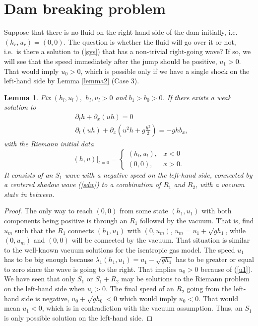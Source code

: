 \documentclass{article}
\theoremstyle{plain}
\newtheorem{lemma}{Lemma}[section]
\theoremstyle{definition}
\theoremstyle{remark}
\begin{document}
\section{Dam breaking problem}

Suppose that there is no fluid on the right-hand side of
the dam initially, i.e.\ $(h_{r},u_{r})=(0,0)$.
The question is whether the fluid will go over it or not, 
i.e.\ is there a solution to (\ref{sys}) that has a non-trivial 
right-going wave? If so, we will see that the speed immediately 
after the jump should be positive, 
$u_{1}>0$. That would imply $u_{0}>0$, which is 
possible only if we have a single shock on the
left-hand side by Lemma \ref{lemma2} (Case 3). 

\begin{lemma}\label{lemma:dam}
Fix $(h_l,u_l),$ $h_l,u_l>0$ and $b_1>b_0>0$. 
If there exists a weak solution to
\[
\begin{split}
& \partial_{t}h + \partial_{x}(uh) = 0 \\
& \partial_{t}(uh) + \partial_{x}\left( u^{2}h + g\frac{h^{2}}{2} \right) = - ghb_{x}, \end{split}\]
with the Riemann initial data
\[
(h,u)|_{t=0} = \begin{cases}
(h_{l},u_{l}), & x < 0 \\
(0,0), & x > 0.\end{cases}
\]
It consists of an $S_1$ wave with a negative speed on the left-hand side,
connected by a centered shadow wave (\ref{sdw}) to a combination of $R_1$ and $R_2$,
with a vacuum state in between. 
\end{lemma}
\noindent
\begin{proof} 
The only way to reach $(0,0)$ from some state $(h_{1},u_{1})$ with both components 
being positive is through an $R_{1}$ followed by the vacuum. That is, find $u_{m}$ such
that the $R_{1}$ connects $(h_{1},u_{1})$ with $(0,u_{m})$, 
$u_{m}=u_{1}+\sqrt{gh_{1}}$,
while $(0,u_{m})$ and $(0,0)$ will be connected by the vacuum. 
That situation is similar to the well-known vacuum solutions 
for the isentropic gas model. The speed $u_{1}$ has to be big enough
because $\lambda_{1}(h_{1},u_{1})=u_{1}-\sqrt{gh_{1}}$ has to be greater
or equal to zero since the wave is going to the right. That implies $u_{0}>0$ because
of (\ref{u1}). We have seen that only $S_1$ or $S_1+R_2$ may be solutions
to the Riemann problem on the left-hand side when $u_l>0$.
The final speed of an $R_{2}$ going from the left-hand side
is negative, $u_{0}+\sqrt{gh_{0}}<0$ which would imply 
$u_{0}<0$. That would mean $u_1<0$, which is in contradiction with the vacuum assumption.
Thus, an $S_{1}$ is only possible solution on the left-hand
side. 
\end{proof}
\end{document}
